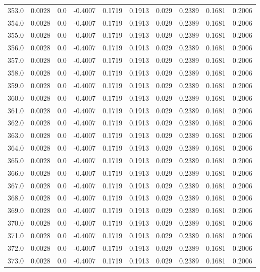 \begin{longtable}{lrrrrrrrrr}
353.0 & 0.0028 & 0.0 & -0.4007 & 0.1719 & 0.1913 & 0.029 & 0.2389 & 0.1681 & 0.2006 \\
354.0 & 0.0028 & 0.0 & -0.4007 & 0.1719 & 0.1913 & 0.029 & 0.2389 & 0.1681 & 0.2006 \\
355.0 & 0.0028 & 0.0 & -0.4007 & 0.1719 & 0.1913 & 0.029 & 0.2389 & 0.1681 & 0.2006 \\
356.0 & 0.0028 & 0.0 & -0.4007 & 0.1719 & 0.1913 & 0.029 & 0.2389 & 0.1681 & 0.2006 \\
357.0 & 0.0028 & 0.0 & -0.4007 & 0.1719 & 0.1913 & 0.029 & 0.2389 & 0.1681 & 0.2006 \\
358.0 & 0.0028 & 0.0 & -0.4007 & 0.1719 & 0.1913 & 0.029 & 0.2389 & 0.1681 & 0.2006 \\
359.0 & 0.0028 & 0.0 & -0.4007 & 0.1719 & 0.1913 & 0.029 & 0.2389 & 0.1681 & 0.2006 \\
360.0 & 0.0028 & 0.0 & -0.4007 & 0.1719 & 0.1913 & 0.029 & 0.2389 & 0.1681 & 0.2006 \\
361.0 & 0.0028 & 0.0 & -0.4007 & 0.1719 & 0.1913 & 0.029 & 0.2389 & 0.1681 & 0.2006 \\
362.0 & 0.0028 & 0.0 & -0.4007 & 0.1719 & 0.1913 & 0.029 & 0.2389 & 0.1681 & 0.2006 \\
363.0 & 0.0028 & 0.0 & -0.4007 & 0.1719 & 0.1913 & 0.029 & 0.2389 & 0.1681 & 0.2006 \\
364.0 & 0.0028 & 0.0 & -0.4007 & 0.1719 & 0.1913 & 0.029 & 0.2389 & 0.1681 & 0.2006 \\
365.0 & 0.0028 & 0.0 & -0.4007 & 0.1719 & 0.1913 & 0.029 & 0.2389 & 0.1681 & 0.2006 \\
366.0 & 0.0028 & 0.0 & -0.4007 & 0.1719 & 0.1913 & 0.029 & 0.2389 & 0.1681 & 0.2006 \\
367.0 & 0.0028 & 0.0 & -0.4007 & 0.1719 & 0.1913 & 0.029 & 0.2389 & 0.1681 & 0.2006 \\
368.0 & 0.0028 & 0.0 & -0.4007 & 0.1719 & 0.1913 & 0.029 & 0.2389 & 0.1681 & 0.2006 \\
369.0 & 0.0028 & 0.0 & -0.4007 & 0.1719 & 0.1913 & 0.029 & 0.2389 & 0.1681 & 0.2006 \\
370.0 & 0.0028 & 0.0 & -0.4007 & 0.1719 & 0.1913 & 0.029 & 0.2389 & 0.1681 & 0.2006 \\
371.0 & 0.0028 & 0.0 & -0.4007 & 0.1719 & 0.1913 & 0.029 & 0.2389 & 0.1681 & 0.2006 \\
372.0 & 0.0028 & 0.0 & -0.4007 & 0.1719 & 0.1913 & 0.029 & 0.2389 & 0.1681 & 0.2006 \\
373.0 & 0.0028 & 0.0 & -0.4007 & 0.1719 & 0.1913 & 0.029 & 0.2389 & 0.1681 & 0.2006 \\

\end{longtable}
